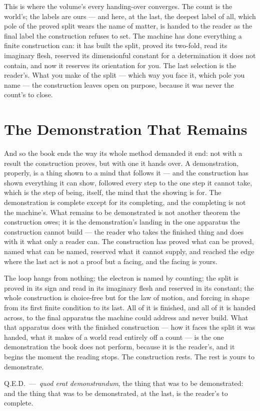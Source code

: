 This is where the volume's every handing-over converges. The count is the world's; the labels are ours --- and
here, at the last, the deepest label of all, which pole of the proved split wears the name of matter, is handed
to the reader as the final label the construction refuses to set. The machine has done everything a finite
construction can: it has built the split, proved its two-fold, read its imaginary flesh, reserved its dimensionful
constant for a determination it does not contain, and now it reserves its orientation for you. The last selection
is the reader's. What you make of the split --- which way you face it, which pole you name --- the construction
leaves open on purpose, because it was never the count's to close.

\section{The Demonstration That Remains}

And so the book ends the way its whole method demanded it end: not with a result the construction proves, but with
one it hands over. A demonstration, properly, is a thing shown to a mind that follows it --- and the construction
has shown everything it can show, followed every step to the one step it cannot take, which is the step of being,
itself, the mind that the showing is for. The demonstration is complete except for its completing, and the
completing is not the machine's. What remains to be demonstrated is not another theorem the construction owes; it
is the demonstration's landing in the one apparatus the construction cannot build --- the reader who takes the
finished thing and does with it what only a reader can. The construction has proved what can be proved, named what
can be named, reserved what it cannot supply, and reached the edge where the last act is not a proof but a facing,
and the facing is yours.

The loop hangs from nothing; the electron is named by counting; the split is proved in its sign and read in its
imaginary flesh and reserved in its constant; the whole construction is choice-free but for the law of motion, and
forcing in shape from its first finite condition to its last. All of it is finished, and all of it is handed
across, to the final apparatus the machine could address and never build. What that apparatus does with the
finished construction --- how it faces the split it was handed, what it makes of a world read entirely off a
count --- is the one demonstration the book does not perform, because it is the reader's, and it begins the moment
the reading stops. The construction rests. The rest is yours to demonstrate.

\hfill Q.E.D.\ ---\ \emph{quod erat demonstrandum}, the thing that was to be demonstrated: and the thing that was
to be demonstrated, at the last, is the reader's to complete.
